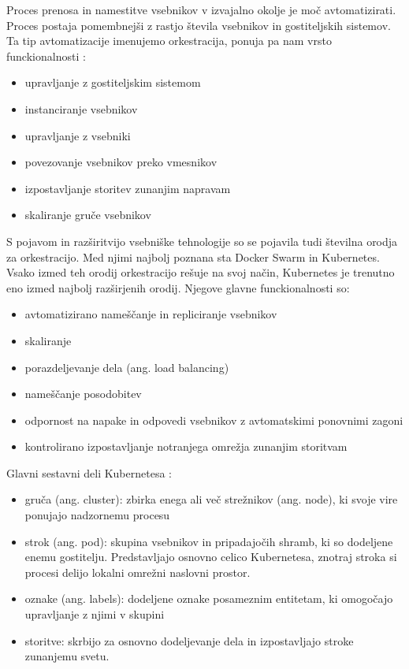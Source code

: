 \documentclass[a4paper, 12pt]{book}
\begin{document}
Proces prenosa in namestitve vsebnikov v izvajalno okolje je moč avtomatizirati.
Proces postaja pomembnejši z rastjo števila vsebnikov in gostiteljskih sistemov. 
Ta tip avtomatizacije imenujemo orkestracija, ponuja pa nam vrsto funckionalnosti \cite{mongoKubernetes}:
\begin{itemize}
	\item upravljanje z gostiteljskim sistemom
	\item instanciranje vsebnikov
	\item upravljanje z vsebniki
	\item povezovanje vsebnikov preko vmesnikov
	\item izpostavljanje storitev zunanjim napravam
	\item skaliranje gruče vsebnikov
\end{itemize}

S pojavom in razširitvijo vsebniške tehnologije so se pojavila tudi številna orodja za orkestracijo.
Med njimi najbolj poznana sta Docker Swarm in Kubernetes.
Vsako izmed teh orodij orkestracijo rešuje na svoj način, Kubernetes je trenutno eno izmed najbolj razširjenih orodij.
Njegove glavne funckionalnosti so:
\begin{itemize}
	\item avtomatizirano nameščanje in repliciranje vsebnikov
	\item skaliranje
	\item porazdeljevanje dela (ang. load balancing)
	\item nameščanje posodobitev
	\item odpornost na napake in odpovedi vsebnikov z avtomatskimi ponovnimi zagoni
	\item kontrolirano izpostavljanje notranjega omrežja zunanjim storitvam
\end{itemize}

Glavni sestavni deli Kubernetesa \cite{mongoKubernetes}: 
\begin{itemize}
	\item gruča (ang. cluster): zbirka enega ali več strežnikov (ang. node), ki svoje vire ponujajo nadzornemu procesu
	\item strok (ang. pod): skupina vsebnikov in pripadajočih shramb, ki so dodeljene enemu gostitelju. Predstavljajo osnovno celico Kubernetesa, znotraj stroka si procesi delijo lokalni omrežni naslovni prostor.
	\item oznake (ang. labels): dodeljene oznake posameznim entitetam, ki omogočajo upravljanje z njimi v skupini
	\item storitve: skrbijo za osnovno dodeljevanje dela in izpostavljajo stroke zunanjemu svetu.
\end{itemize}
\end{document}
